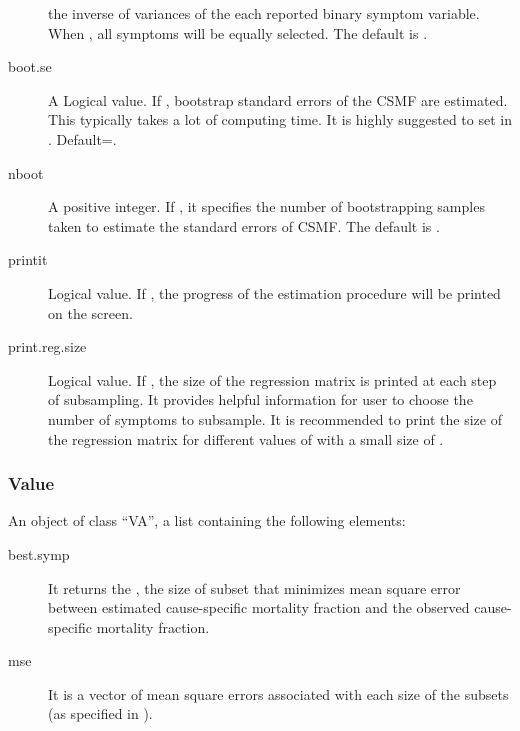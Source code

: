 \documentclass[oneside,letterpaper,titlepage]{article}
\begin{document}
\begin{description}
     the inverse of variances of the each reported binary symptom variable.   
     When , all symptoms will be equally selected. 
     The default is .
   \item[boot.se] A Logical value. If , bootstrap
     standard errors of the CSMF are estimated.  This typically takes a lot
     of computing time. It is highly suggested to set
      in . Default=.
  \item[nboot] A positive integer. If , it
    specifies the number of bootstrapping samples taken to estimate the
    standard errors of CSMF. The default is .
  \item[printit] Logical value. If , the progress of the
    estimation procedure will be printed on the screen.
  \item[print.reg.size] Logical value. If , the size of the
  regression matrix is printed at each step of subsampling. It provides
  helpful information for user to choose the number of symptoms to
  subsample. It is recommended to print the size of the regression
  matrix for different values of  with a small size of
  . 
\end{description}

\subsubsection{Value}
An object of class ``VA'', a list containing the following elements:
\begin{description}
 \item[best.symp] It returns the , the size of
  subset that minimizes mean square error between estimated
  cause-specific mortality fraction and the observed cause-specific
  mortality fraction. 
\item[mse] It is a vector of  mean square errors
  associated with each size of the subsets (as specified in ).
\end{description}

 
\bibsep=0in 

\end{document}
